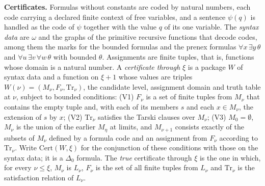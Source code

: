 \documentclass[11pt]{article}
\begin{document}
\textbf{Certificates.} Formulas without constants are coded by natural numbers, each code carrying a
declared finite context of free variables, and a sentence $\psi(q)$ is handled as the code of $\psi$ together with the
value $q$ of its one variable. The \emph{syntax data} are $\omega$ and the graphs of the primitive recursive functions
that decode codes, among them the marks for the bounded formulas and the prenex formulas $\forall x\, \exists y\, \theta$ and
$\forall u\, \exists v\, \forall w\, \theta$ with bounded $\theta$. Assignments are finite tuples, that is, functions
whose domain is a natural number. A \emph{certificate through $\xi$} is a
package $W$ of syntax data and a function on $\xi+1$ whose values are triples $W(\nu) = (M_\nu, F_\nu,
\mathrm{Tr}_\nu)$, the candidate level, assignment domain and truth table at $\nu$, subject to bounded conditions:
(V1) $F_\nu$ is a set of finite tuples from $M_\nu$ that contains the empty tuple and, with each of its members $s$ and
each $x \in M_\nu$, the extension of $s$ by $x$; (V2) $\mathrm{Tr}_\nu$ satisfies the Tarski clauses over $M_\nu$; (V3) $M_0 = \emptyset$, $M_\nu$ is the union of the earlier $M_\eta$ at limits, and
$M_{\nu+1}$ consists exactly of the subsets of $M_\nu$ defined by a formula code and an assignment from $F_\nu$
according to $\mathrm{Tr}_\nu$. Write $\mathrm{Cert}(W, \xi)$ for the conjunction of these conditions with those on
the syntax data; it is a $\Delta_0$ formula. The \emph{true} certificate through $\xi$ is the one in which, for every
$\nu \le \xi$, $M_\nu$ is $L_{\nu}$, $F_\nu$ is the set of all finite tuples from $L_{\nu}$ and $\mathrm{Tr}_\nu$ is
the satisfaction relation of $L_{\nu}$.
\end{document}
